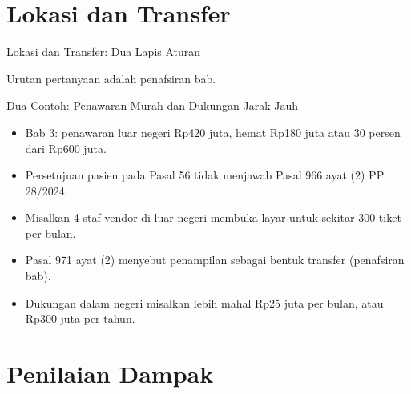 \documentclass[aspectratio=169, table, 12pt]{beamer}
\begin{document}
\section{Lokasi dan Transfer}

\begin{frame}{{\Large Lokasi dan Transfer: Dua Lapis Aturan}}
  \vspace{2pt}
  \begin{center}
    \resizebox{!}{0.66\textheight}{}
  \end{center}
  \vspace{-6pt}
  \small Urutan pertanyaan adalah penafsiran bab.
\end{frame}

\begin{frame}{{\Large Dua Contoh: Penawaran Murah dan Dukungan Jarak Jauh}}
  \vspace{6pt}
  \small
  \begin{itemize}
    \item Bab 3: penawaran luar negeri Rp420 juta, hemat Rp180 juta atau 30 persen dari Rp600 juta.
    \item Persetujuan pasien pada Pasal 56 tidak menjawab Pasal 966 ayat (2) PP 28/2024.
    \item Misalkan 4 staf vendor di luar negeri membuka layar untuk sekitar 300 tiket per bulan.
    \item Pasal 971 ayat (2) menyebut penampilan sebagai bentuk transfer (penafsiran bab).
    \item Dukungan dalam negeri misalkan lebih mahal Rp25 juta per bulan, atau Rp300 juta per tahun.
  \end{itemize}
\end{frame}

\section{Penilaian Dampak}
\end{document}
